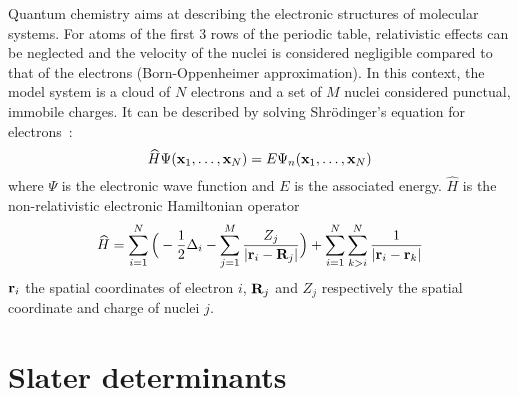 \documentclass[./thesis.tex]{subfiles}
\begin{document}
Quantum chemistry aims at describing the electronic structures of molecular systems.
For atoms of the first 3 rows of the periodic table, relativistic effects can be neglected and the velocity of the nuclei is considered negligible compared to that of the electrons (Born-Oppenheimer approximation). In this context, the model system is a cloud of $N$ electrons and a set of $M$ nuclei considered punctual, immobile charges. It can be described by solving Shrödinger's equation for electrons~:
\begin{equation}
 \widehat{H} \Psi({\bf x}_1,\dots,{\bf x}_N) = E \Psi_n({\bf x}_1,\dots,{\bf x}_N)
\end{equation}
where $\Psi$ is the electronic wave function and $E$ is the associated energy. $\widehat H$ is the non-relativistic electronic Hamiltonian operator
\begin{equation}
\widehat{H} = \sum_{i=1}^{N} \Big ( -\frac{1}{2} \Delta_i - \sum_{j=1}^M \frac{Z_j}{|{\bf r}_i - {\bf R}_j|} \Big ) + \sum_{i=1}^{N} \sum_{k>i}^{N} \frac{1}{|{\bf r}_i - {\bf r}_k|}
\end{equation}
${\bf r}_i$ the spatial coordinates of electron $i$, ${\bf R}_j$ and $Z_j$ respectively the spatial coordinate and charge of nuclei $j$.

\section{Slater determinants}
\end{document}
